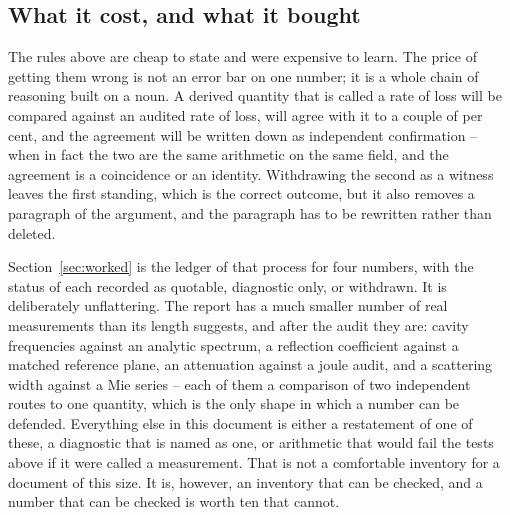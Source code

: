 \subsection{What it cost, and what it bought}
\label{sec:method-cost}

The rules above are cheap to state and were expensive to learn. The price of getting them wrong is not an error
bar on one number; it is a whole chain of reasoning built on a noun. A derived quantity that is called a rate of
loss will be compared against an audited rate of loss, will agree with it to a couple of per cent, and the
agreement will be written down as independent confirmation -- when in fact the two are the same arithmetic on
the same field, and the agreement is a coincidence or an identity. Withdrawing the second as a witness leaves
the first standing, which is the correct outcome, but it also removes a paragraph of the argument, and the
paragraph has to be rewritten rather than deleted.

Section~\ref{sec:worked} is the ledger of that process for four numbers, with the status of each recorded as
quotable, diagnostic only, or withdrawn. It is deliberately unflattering. The report has a much smaller number
of real measurements than its length suggests, and after the audit they are: cavity frequencies against an
analytic spectrum, a reflection coefficient against a matched reference plane, an attenuation against a joule
audit, and a scattering width against a Mie series -- each of them a comparison of two independent routes to one
quantity, which is the only shape in which a number can be defended. Everything else in this document is either
a restatement of one of these, a diagnostic that is named as one, or arithmetic that would fail the tests above
if it were called a measurement. That is not a comfortable inventory for a document of this size. It is,
however, an inventory that can be checked, and a number that can be checked is worth ten that cannot.

